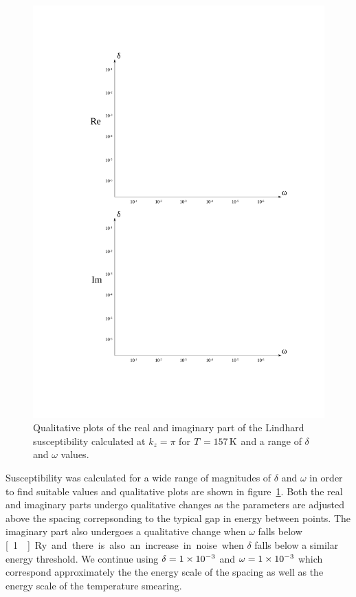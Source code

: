 \begin{figure}[htbp]
    \begin{center}
        \includegraphics[scale=0.9]{Chapter-dHvABaFe2P2/Figures/Susceptibility/RangeDeltaOmega/RangeDeltaOmega}
        \caption{Qualitative plots of the real and imaginary part of the Lindhard susceptibility calculated at $k_z=\pi$ for $T=\unit[157]{K}$ and a range of $\delta$ and $\omega$ values.}
        \label{Fig:ResD:RangeDeltaOmega}
    \end{center}
\end{figure}
Susceptibility was calculated for a wide range of magnitudes of $\delta$ and $\omega$ in order to find suitable values and qualitative plots are shown in  figure~\ref{Fig:ResD:RangeDeltaOmega}. Both the real and imaginary parts undergo qualitative changes as the parameters are adjusted above the spacing correpsonding to the typical gap in energy between points. The imaginary part also undergoes a qualitative change when $\omega$ falls below \unit[1]{Ry} and there is also an increase in noise when $\delta$ falls below a similar energy threshold. We continue using $\delta=1\times 10^{-3}$ and $\omega=1\times 10^{-3}$ which correspond approximately the the energy scale of the spacing as well as the energy scale of the temperature smearing.
